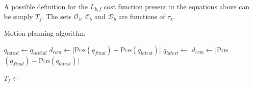\documentclass[eprint]{actapoly}
\begin{document}
A possible definition for the $L_{b,f}$ cost function present in the equations above can be simply $T_f$.
The sets $\mathcal{O}_b$, $\mathcal{C}_b$ and $\mathcal{D}_b$ are functions of
$\tau_k$.

\begin{algorithm}
    \caption{Motion planning algorithm\label{cod:algo}}
    \label{swpa}
    \begin{algorithmic}[1] %
	    \State $q_{latest} \gets q_{initial}$
	    \State $d_{rem} \gets |${\scshape Pos}$(q_{final}) - ${\scshape Pos}$(q_{latest})|$
	    \State {}
		\State $q_{latest} \gets $
		\State $d_{rem} \gets |${\scshape Pos}$(q_{final}) - ${\scshape Pos}$(q_{latest})|$
		
	    \EndWhile\label{planningwhile}
	    \State {}
	    \State $T_f \gets $
	    
        \EndProcedure
    \end{algorithmic}
\end{algorithm}
\end{document}
